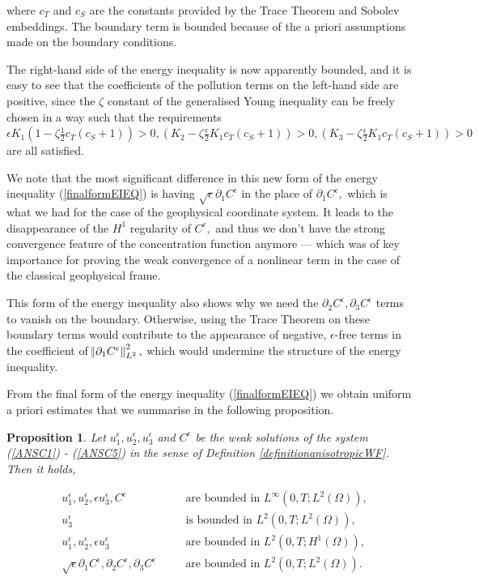 \documentclass[11pt]{article}
\newtheorem{prop}{Proposition}
\begin{document}
  where $c_T$ and $c_S$ are the constants provided by the Trace Theorem and Sobolev embeddings. The boundary term is bounded because of the a priori assumptions made on the boundary conditions.
    
  The right-hand side of the energy inequality is now apparently bounded, and it is easy to see that the coefficients of the pollution terms on the left-hand side are positive, since the $\zeta$ constant of the generalised Young inequality can be freely chosen in a way such that the requirements $\epsilon K_1 (1 - \zeta \frac{1}{2} c_T (c_S + 1)) > 0, (K_2 - \zeta \frac{\epsilon}{2} K_1 c_T (c_S + 1)) > 0, (K_3 - \zeta \frac{\epsilon}{2} K_1 c_T (c_S + 1)) > 0 $ are all satisfied.
  
  We note that the most significant difference in this new form of the energy inequality (\ref{finalformEIEQ}) is having $\sqrt{\epsilon} \partial_1 C^\epsilon$ in the place of $\partial_1 C^\epsilon,$ which is what we had for the case of the geophysical coordinate system. It leads to the disappearance of the $H^1$ regularity of $C^\epsilon,$ and thus we don't have the strong convergence feature of the concentration function anymore --- which was of key importance for proving the weak convergence of a nonlinear term in the case of the classical geophysical frame.
  
  This form of the energy inequality also shows why we need the $\partial_2 C^\epsilon, \partial_3 C^\epsilon$ terms to vanish on the boundary. Otherwise, using the Trace Theorem on these boundary terms would contribute to the appearance of negative, $\epsilon$-free terms in the coefficient of $\norm{\partial_1 C^\epsilon}_{L^2}^2,$ which would undermine the structure of the energy inequality.
  
  From the final form of the energy inequality (\ref{finalformEIEQ}) we obtain uniform a priori estimates that we summarise in the following proposition.
  
  \begin{prop} \label{aprioriprop}
    Let $u^\epsilon_1, u^\epsilon_2, u^\epsilon_3$ and $C^\epsilon$ be the weak solutions of the system (\ref{ANSC1}) - (\ref{ANSC5}) in the sense of Definition \ref{definitionanisotropicWF}. Then it holds,
    
    \begin{align}
      & u^\epsilon_1, u^\epsilon_2, \epsilon u^\epsilon_3, C^\epsilon & \quad & \text{are bounded in $L^\infty (0,T; L^2(\Omega)),$} \label{proposition1} \\
      & u^\epsilon_3 & \quad & \text{is bounded in $L^2 (0,T; L^2(\Omega)),$} \label{propositionExtra} \\
      & u^\epsilon_1, u^\epsilon_2, \epsilon u^\epsilon_3 & \quad & \text{are bounded in $L^2(0,T; H^1(\Omega)),$} \label{proposition2} \\
      & \sqrt{\epsilon} \partial_1 C^\epsilon, \partial_2 C^\epsilon, \partial_3 C^\epsilon & \quad & \text{are bounded in $L^2(0,T;L^2(\Omega)).$} \label{proposition3}
    \end{align}
    
  \end{prop}
  
\end{document}
